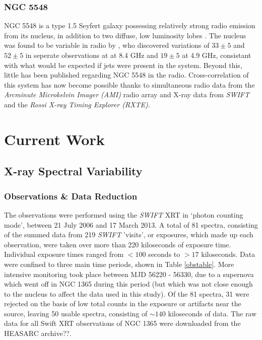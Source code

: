 \documentclass[letters,useAMS,usenatbib]{samnote}
\begin{document}
\subsubsection{NGC 5548}

NGC 5548 is a type 1.5 Seyfert galaxy possessing relatively strong radio emission from its nucleus, in addition to two diffuse, low luminosity lobes \citep{wilson82}.
The nucleus was found to be variable in radio by \citet{wroble00}, who discovered variations of $33\pm 5$ and $52\pm 5$ in seperate observations at at 8.4 GHz and
$19\pm 5$ at 4.9 GHz, consistant with what would be expected if jets were present in the system. Beyond this, little has been published regarding NGC 5548 in the radio.
Cross-correlation of this system has now become possible thanks to simultaneous radio data from the {\it Arcminute Microkelvin Imager (AMI)} radio array and X-ray data
from {\it SWIFT} and the {\it Rossi X-ray Timing Explorer (RXTE)}.

\clearpage

\section{Current Work}

\subsection{X-ray Spectral Variability}

\subsubsection{Observations \& Data Reduction} \label{reduction}

The observations were performed using the {\it SWIFT} XRT in `photon counting mode', between 21 July 2006 and 17 March 2013. A total of 81 spectra, consisting of the
summed data from 219 {\it SWIFT} 'visits', or exposures, which made up each observation, were taken over more than 220 kiloseconds of exposure time. Individual
exposure times ranged from $<100$ seconds to $>17$ kiloseconds. Data were confined to three main time periods, shown in Table \ref{obstable}. More intensive monitoring
took place between MJD 56220 - 56330, due to a supernova which went off in NGC 1365 during this period (but which was not close enough to the nucleus to affect the data
used in this study). Of the 81 spectra, 31 were rejected on the basis of low total counts in the exposure or artifacts near the source, leaving 50 usable spectra,
consisting of $\sim 140$ kiloseconds of data. The raw data for all Swift XRT observations of NGC 1365 were downloaded from the HEASARC
archive??.
\end{document}
